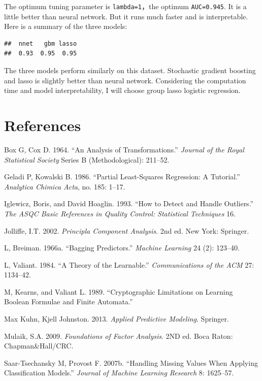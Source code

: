 \documentclass[]{book}
\theoremstyle{definition}
\theoremstyle{definition}
\theoremstyle{remark}
\begin{document}
The optimum tuning parameter is \texttt{lambda=1}，the optimum
\texttt{AUC=0.945}. It is a little better than neural network. But it
runs much faster and is interpretable. Here is a summary of the three
models:

\begin{verbatim}
##  nnet   gbm lasso 
##  0.93  0.95  0.95
\end{verbatim}

The three models perform similarly on this dataset. Stochastic gradient
boosting and lasso is slightly better than neural network. Considering
the computation time and model interpretability, I will choose group
lasso logistic regression.

\chapter{References}\label{references}

\hypertarget{refs}{}
\hypertarget{ref-BOXCOX1}{}
Box G, Cox D. 1964. ``An Analysis of Transformations.'' \emph{Journal of
the Royal Statistical Society} Series B (Methodological): 211--52.

\hypertarget{ref-PLS1}{}
Geladi P, Kowalski B. 1986. ``Partial Least-Squares Regression: A
Tutorial.'' \emph{Analytica Chimica Acta}, no. 185: 1--17.

\hypertarget{ref-mad1}{}
Iglewicz, Boris, and David Hoaglin. 1993. ``How to Detect and Handle
Outliers.'' \emph{The ASQC Basic References in Quality Control:
Statistical Techniques} 16.

\hypertarget{ref-pca1}{}
Jolliffe, I.T. 2002. \emph{Principla Component Analysis}. 2nd ed. New
York: Springer.

\hypertarget{ref-bag1}{}
L, Breiman. 1966a. ``Bagging Predictors.'' \emph{Machine Learning} 24
(2): 123--40.

\hypertarget{ref-Valiant1984}{}
L, Valiant. 1984. ``A Theory of the Learnable.'' \emph{Communications of
the ACM} 27: 1134--42.

\hypertarget{ref-KV1989}{}
M, Kearns, and Valiant L. 1989. ``Cryptographic Limitations on Learning
Boolean Formulae and Finite Automata.''

\hypertarget{ref-APM}{}
Max Kuhn, Kjell Johnston. 2013. \emph{Applied Predictive Modeling}.
Springer.

\hypertarget{ref-EFA1}{}
Mulaik, S.A. 2009. \emph{Foundations of Factor Analysis}. 2ND ed. Boca
Raton: Chapman\&Hall/CRC.

\hypertarget{ref-missing1}{}
Saar-Tsechansky M, Provost F. 2007b. ``Handling Missing Values When
Applying Classification Models.'' \emph{Journal of Machine Learning
Research} 8: 1625--57.
\end{document}
